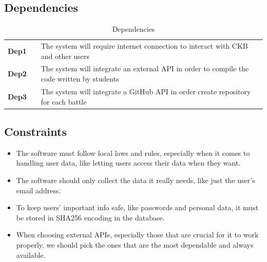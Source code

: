 \subsection{Dependencies}
\begin{table}[H]
    \centering
    \renewcommand{\arraystretch}{1.5}
    \begin{tabular}{l l p{11.5cm}}
        \hline
        \textbf{Dep1} &  & The system will require internet connection to interact with CKB and other users           \\
        \textbf{Dep2} &  & The system will integrate an external API in order to compile the code written by students \\
        \textbf{Dep3} &  & The system will integrate a GitHub API in order create repository for each battle          \\
        \hline
    \end{tabular}
    \caption{Dependencies}
\end{table}

\subsection{Constraints}

\begin{itemize}
    \item The software must follow local laws and rules, especially when it comes to handling user data, like letting users access their data when they want.
    \item The software should only collect the data it really needs, like just the user's email address.
    \item To keep users' important info safe, like passwords and personal data, it must be stored in SHA256 encoding in the database.
    \item When choosing external APIs, especially those that are crucial for it to work properly, we should pick the ones that are the most dependable and always available.
\end{itemize}